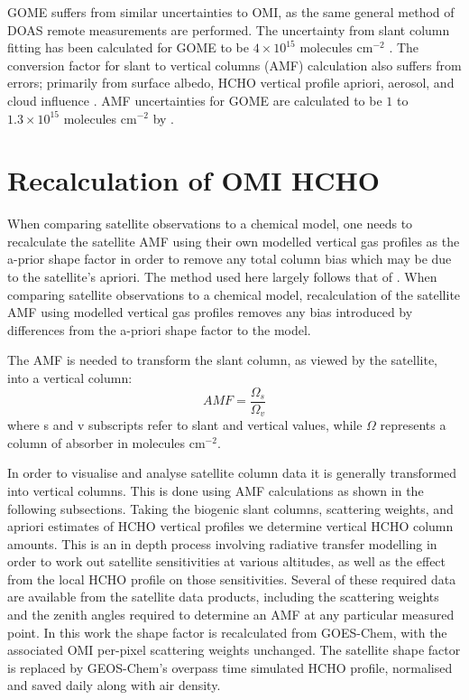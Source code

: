       GOME suffers from similar uncertainties to OMI, as the same general method of DOAS remote measurements are performed.
      The uncertainty from slant column fitting has been calculated for GOME to be $4\times10^{15}$ molecules cm$^{-2}$ \parencite{Chance2000, Millet2006}. 
      The conversion factor for slant to vertical columns (AMF) calculation also suffers from errors; primarily from surface albedo, HCHO vertical profile apriori, aerosol, and cloud influence \parencite{Millet2006}. 
      AMF uncertainties for GOME are calculated to be $1$ to $1.3\times10^{15}$ molecules cm$^{-2}$ by \textcite{Shim2005}.

\section{Recalculation of OMI HCHO}
  \label{Model:omiRecalc}
  
  When comparing satellite observations to a chemical model, one needs to recalculate the satellite AMF using their own modelled vertical gas profiles as the a-prior shape factor in order to remove any total column bias which may be due to the satellite's apriori.
  The method used here largely follows that of \citet{Palmer2001}.
  When comparing satellite observations to a chemical model, recalculation of the satellite AMF using modelled vertical gas profiles removes any bias introduced by differences from the a-priori shape factor to the model.
  
  The AMF is needed to transform the slant column, as viewed by the satellite, into a vertical column:
  \begin{equation}
  \label{eqn:AMFratio}
  AMF = \frac{\Omega_s}{\Omega_v} %
  \end{equation}
  where s and v subscripts refer to slant and vertical values, while $\Omega$ represents a column of absorber in molecules cm$^{-2}$.
  
  
  In order to visualise and analyse satellite column data it is generally transformed into vertical columns. 
  This is done using AMF calculations as shown in the following subsections.
  Taking the biogenic slant columns, scattering weights, and apriori estimates of HCHO vertical profiles we determine vertical HCHO column amounts.
  This is an in depth process involving radiative transfer modelling in order to work out satellite sensitivities at various altitudes, as well as the effect from the local HCHO profile on those sensitivities.
  Several of these required data are available from the satellite data products, including the scattering weights and the zenith angles required to determine an AMF at any particular measured point.
  In this work the shape factor is recalculated from GOES-Chem, with the associated OMI per-pixel scattering weights unchanged. 
  The satellite shape factor is replaced by GEOS-Chem's overpass time simulated HCHO profile, normalised and saved daily along with air density.
  
